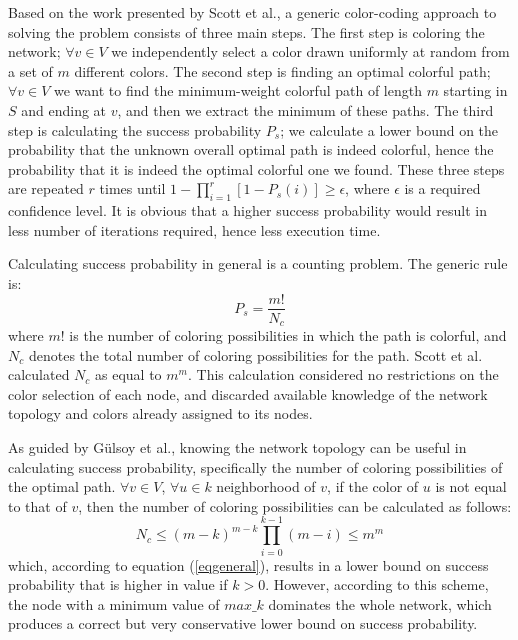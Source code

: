 \documentclass{ws-procs11x85}
\begin{document}
Based on the work presented by Scott et al.\cite{scott}, a generic color-coding
approach to solving the problem consists of three main steps. The first step is
coloring the network; $\forall v \in V$ we independently select a color drawn
uniformly at random from a set of $m$ different colors. The second step is
finding an optimal colorful path; $\forall v \in V$ we want to find the
minimum-weight colorful path of length $m$ starting in $S$ and ending at $v$,
and then we extract the minimum of these paths. The third step is calculating
the success probability $P_s$; we calculate a lower bound on the probability
that the unknown overall optimal path is indeed colorful, hence the probability
that it is indeed the optimal colorful one we found. These three steps are
repeated $r$ times until $1 - \prod_{i=1}^r [1 - P_s(i)] \geq \epsilon$, where
$\epsilon$ is a required confidence level. It is obvious that a higher success
probability would result in less number of iterations required, hence less
execution time.

Calculating success probability in general is a counting problem. The
generic rule is:
\begin{equation}
P_s = \frac{m!}{N_c}
\label{eqgeneral}
\end{equation} 
where $m!$ is the number of coloring possibilities in which the path is
colorful, and $N_c$ denotes the total number of coloring possibilities for the
path. Scott et al.\cite{scott} calculated $N_c$ as equal to $m^m$. This
calculation considered no restrictions on the color selection of each node, and
discarded available knowledge of the network topology and colors already
assigned to its nodes.

As guided by G{\"u}lsoy et al.\cite{gulsoy}, knowing the network topology can be
useful in calculating success probability, specifically the number of coloring
possibilities of the optimal path. $\forall v \in V$, $\forall u \in k$
neighborhood of $v$, if the color of $u$ is not equal to that of $v$, then the
number of coloring possibilities can be calculated as follows:
\begin{equation}
N_c \leq (m - k)^{m - k} \prod_{i=0}^{k-1} (m - i)  \leq  m^m
\end{equation}
which, according to equation (\ref{eqgeneral}), results in a lower bound on success
probability that is higher in value if $k > 0$. However, according to this
scheme, the node with a minimum value of $max\_k$ dominates the whole network,
which produces a correct but very conservative lower bound on success
probability.
\end{document}

